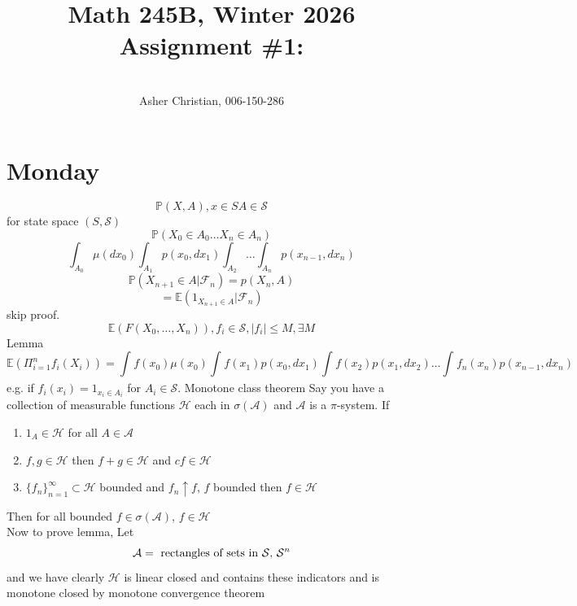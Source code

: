 \documentclass[11pt]{article}
\newcommand{\cnum}{Math 245B}
\newcommand{\ced}{Winter 2026}
\newcommand{\ctitle}[4]{\title{\vspace{-0.5in}\cnum, \ced\\Assignment #1: #2}\author{\vspace{-0.35in}\\#3, #4}}
\begin{document}
\ctitle{\#1}{}{Asher Christian}{006-150-286}
\date{}
\maketitle

\section{Monday}
\[
    \mathbb{P}(X,A) , x \in S A \in \mathcal{S}
\] 
for state space $(S, \mathcal{S})$
\[
\mathbb{P}(X_0 \in A_0 \dots X_n \in A_n)
\] 
\[
    \int_{A_0}^{}\mu(dx_0) \int_{A_1}^{}p(x_0,dx_1) \int_{A_2}^{}\dots \int_{A_n}^{}p(x_{n-1}, dx_n)
\] 
\[
    \mathbb{P}(X_{n+1} \in A | \mathcal{F}_n) = p(X_n, A)
\] 
\[
    = \mathbb{E}(1_{X_{n+1} \in A} | \mathcal{F}_n)
\] 
skip proof.
\[
    \mathbb{E}(F(X_0,\dots,X_n)), f_i \in \mathcal{S}, |f_i| \le M, \exists M
\] 
Lemma
\[
    \mathbb{E}( \Pi_{i=1}^{n}f_i(X_i)) = \int_{}^{}f(x_0) \mu(x_0) \int_{}^{}f(x_1) p(x_0,dx_1) \int_{}^{}f(x_2) p(x_1,dx_2) \dots \int_{}^{}f_n(x_n) p(x_{n-1},dx_n)
\] 
e.g. if $f_i(x_i) = 1_{x_i \in A_i}$ for  $A_i \in \mathcal{S}$.
Monotone class theorem
Say you have a collection of measurable functions  $\mathcal{H}$ each in $\sigma( \mathcal{A})$ 
and $  \mathcal{A}$ is a $ \pi$-system. If
\begin{enumerate}
    \item $1_A \in \mathcal{H}$ for all $A \in \mathcal{A}$
    \item $f,g \in \mathcal{H}$ then $f+g \in \mathcal{H}$ and $c f \in \mathcal{H}$ 
    \item $\{f_n\}_{n=1}^{\infty} \subset \mathcal{H}$ bounded and 
        $f_n \uparrow f$, $f$ bounded then $f \in \mathcal{H}$
\end{enumerate}
Then for all bounded $f \in \sigma( \mathcal{A})$, $f \in \mathcal{H}$\\
Now to prove lemma, Let
 \[
     \mathcal{A} = \text{ rectangles of sets in $ \mathcal{S}$, $\mathcal{S}^{n}$}
\] 
and we have clearly $\mathcal{H}$ is linear closed and contains these indicators and is monotone closed by monotone convergence theorem 
\end{document}

